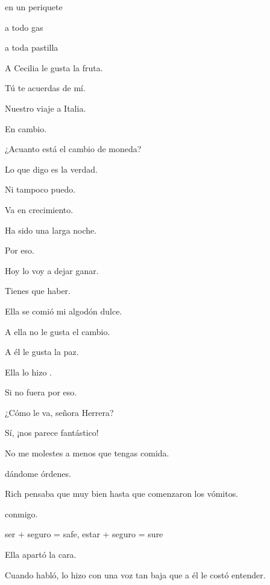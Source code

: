 en un periquete

a todo gas

a toda pastilla

\bsk
A Cecilia le gusta la fruta.

\sk
Tú te acuerdas de mí.

\sk
Nuestro viaje a Italia.

\sk
En cambio. 

\sk
¿Acuanto está el cambio de moneda?

\sk
Lo que digo es la verdad.

\sk
Ni tampoco puedo. 

\sk
Va en crecimiento. 

\sk
Ha sido una larga noche.

\sk
Por eso. 

\sk
Hoy lo voy a dejar ganar.

\sk
Tienes que haber. 

\sk
Ella se comió mi algodón dulce. 

\sk
A ella no le gusta el cambio.

\sk
A él le gusta la paz.

\sk
Ella lo hizo . 

\sk
Si no fuera por eso. 

\sk
¿Cómo le va, señora Herrera?

\sk
Sí, ¡nos parece fantástico! 

\sk
No me molestes a menos que tengas comida. 

\sk
{} dándome órdenes. 

\sk
Rich pensaba que  muy bien hasta que comenzaron los vómitos. 

\sk
{} conmigo. 

\sk
ser + seguro = safe, estar + seguro = sure

\sk
Ella apartó la cara. 

\sk
Cuando habló, lo hizo con una voz tan baja que a él le costó entender. 

